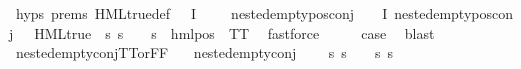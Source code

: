 \begin{isabellebody}
\ {\isachardoublequoteopen}{}{\isachardot}{\kern0pt}hyps{\isachardoublequoteclose}\ {\isachardoublequoteopen}{}{\isachardot}{\kern0pt}prems{\isachardoublequoteclose}\ HML{\isacharunderscore}{\kern0pt}true{\isacharunderscore}{\kern0pt}def\ {\isacartoucheopen}{\isasymforall}{\isasympsi}{\isasymin}{\isasymPhi}\ {\isacharbackquote}{\kern0pt}\ I{\isachardot}{\kern0pt}\ {\isasympsi}\ {\isasymnoteq}\ {\isasymphi}\ {\isasymlongrightarrow}\ nested{\isacharunderscore}{\kern0pt}empty{\isacharunderscore}{\kern0pt}pos{\isacharunderscore}{\kern0pt}conj\ {\isasympsi}{\isacartoucheclose}\ {\isacartoucheopen}{\isasymforall}{\isasympsi}{\isasymin}{\isasymPhi}\ {\isacharbackquote}{\kern0pt}\ I{\isachardot}{\kern0pt}\ nested{\isacharunderscore}{\kern0pt}empty{\isacharunderscore}{\kern0pt}pos{\isacharunderscore}{\kern0pt}conj\ {\isasympsi}\ {\isasymlongrightarrow}\ HML{\isacharunderscore}{\kern0pt}true\ {\isasympsi}{\isacartoucheclose}\ {\isacartoucheopen}{\isasymforall}s{\isachardot}{\kern0pt}\ {\isacharparenleft}{\kern0pt}s\ {\isasymTurnstile}\ {\isasymphi}{\isacharparenright}{\kern0pt}\ {\isacharequal}{\kern0pt}\ {\isacharparenleft}{\kern0pt}s\ {\isasymTurnstile}\ hml{\isacharunderscore}{\kern0pt}pos\ {\isasymalpha}\ TT{\isacharparenright}{\kern0pt}{\isacartoucheclose}\ \isamarkupfalse%
\ fastforce\isanewline
\ \ \isamarkupfalse%
\ \isamarkupfalse%
\ {\isacharquery}{\kern0pt}case\ \isamarkupfalse%
\ blast\isanewline
{}\isamarkupfalse%
%
\endisatagproof
{\isafoldproof}%
%
\isadelimproof
\isanewline
%
\endisadelimproof
\isanewline
{}\isamarkupfalse%
\ nested{\isacharunderscore}{\kern0pt}empty{\isacharunderscore}{\kern0pt}conj{\isacharunderscore}{\kern0pt}TT{\isacharunderscore}{\kern0pt}or{\isacharunderscore}{\kern0pt}FF{\isacharcolon}{\kern0pt}\isanewline
\ \ \ {\isachardoublequoteopen}nested{\isacharunderscore}{\kern0pt}empty{\isacharunderscore}{\kern0pt}conj\ {\isasymphi}{\isachardoublequoteclose}\isanewline
\ \ \ {\isachardoublequoteopen}{\isacharparenleft}{\kern0pt}{\isasymforall}s{\isachardot}{\kern0pt}\ {\isacharparenleft}{\kern0pt}s\ {\isasymTurnstile}\ {\isasymphi}{\isacharparenright}{\kern0pt}{\isacharparenright}{\kern0pt}\ {\isasymor}\ {\isacharparenleft}{\kern0pt}{\isasymforall}s{\isachardot}{\kern0pt}\ {\isasymnot}{\isacharparenleft}{\kern0pt}s\ {\isasymTurnstile}\ {\isasymphi}{\isacharparenright}{\kern0pt}{\isacharparenright}{\kern0pt}{\isachardoublequoteclose}\isanewline
%
\isadelimproof
\ \ %
\endisadelimproof

\end{isabellebody}
